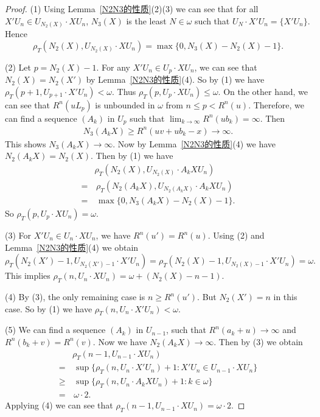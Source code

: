 \documentclass[11pt]{amsart}
\theoremstyle{definition}
\theoremstyle{remark}
\numberwithin{equation}{section}
\begin{document}
\begin{proof}
    (1) Using Lemma~\ref{N2N3的性质}(2)(3) we can see that for all $X'U_n\in U_{N_2(X)}\cdot XU_n$, $N_3(X)$ is the least $N\in\omega$ such that $U_N\cdot X'U_n=\{X'U_n\}$. Hence
    $$\rho_T(N_2(X),U_{N_2(X)}\cdot XU_n)=\max\{0,N_3(X)-N_2(X)-1\}.$$

    (2) Let $p=N_2(X)-1$. For any $X'U_n\in U_p\cdot XU_n$, we can see that $N_2(X)=N_2(X')$ by Lemma~\ref{N2N3的性质}(4). So by (1) we have $\rho_T(p+1,U_{p+1}\cdot X'U_n)<\omega$. Thus $\rho_T(p,U_p\cdot XU_n)\leq\omega$. On the other hand, we can see that $R^n(uL_p)$ is unbounded in $\omega$ from $n\leq p<R^n(u)$. Therefore, we can find a sequence $(A_k)$ in $U_p$ such that $\lim_{k\to\infty}R^n(ub_k)=\infty$. Then
    \begin{align*}
        N_3(A_kX)\geq R^n(uv+ub_k-x)\to\infty.
    \end{align*}
    This shows $N_3(A_kX)\to\infty$. Now by Lemma~\ref{N2N3的性质}(4) we have $N_2(A_kX)=N_2(X)$. Then by (1) we have
    \begin{align*}
        &\rho_T(N_2(X),U_{N_2(X)}\cdot A_kXU_n)\\
        =&\,\rho_T(N_2(A_kX),U_{N_2(A_kX)}\cdot A_kXU_n)\\
        =&\,\max\{0,N_3(A_kX)-N_2(X)-1\}.
    \end{align*}
    So $\rho_T(p,U_p\cdot XU_n)=\omega$.

    (3) For $X'U_n\in U_n\cdot XU_n$, we have $R^n(u')=R^n(u)$. Using (2) and Lemma~\ref{N2N3的性质}(4) we obtain
    $$\rho_T(N_2(X')-1,U_{N_2(X')-1}\cdot X'U_n)=\rho_T(N_2(X)-1,U_{N_2(X)-1}\cdot X'U_n)=\omega.$$
    This implies $\rho_T(n,U_n\cdot XU_n)=\omega+(N_2(X)-n-1)$.

    (4) By (3), the only remaining case is $n\geq R^n(u')$. But $N_2(X')=n$ in this case. So by (1) we have $\rho_T(n,U_n\cdot X'U_n)<\omega$.

    (5) We can find a sequence $(A_k)$ in $U_{n-1}$, such that $R^n(a_k+u)\to\infty$ and $R^n(b_k+v)=R^n(v)$. Now we have $N_2(A_kX)\to\infty$. Then by (3) we obtain
    \begin{align*}
        &\rho_T(n-1,U_{n-1}\cdot XU_n)\\
        =&\,\sup\{\rho_T(n,U_n\cdot X'U_n)+1:X'U_n\in U_{n-1}\cdot XU_n\}\\
        \geq&\,\sup\{\rho_T(n,U_n\cdot A_kXU_n)+1:k\in\omega\}\\
        =&\,\omega\cdot 2.
    \end{align*}
    Applying (4) we can see that $\rho_T(n-1,U_{n-1}\cdot XU_n)=\omega\cdot 2$.
\end{proof}
\end{document}
